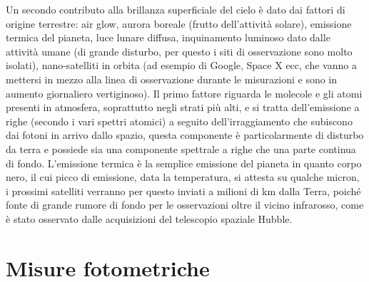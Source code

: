 \documentclass[a4paper,twoside,openany,notitlepage]{book}
\theoremstyle{definition}
\theoremstyle{plain}
\begin{document}
Un secondo contributo alla brillanza superficiale del cielo è dato dai fattori di origine terrestre: air glow, aurora boreale (frutto dell'attività solare), emissione termica del pianeta, luce lunare diffusa, inquinamento luminoso dato dalle attività umane (di grande disturbo, per questo i siti di osservazione sono molto isolati), nano-satelliti in orbita (ad esempio di Google, Space X ecc, che vanno a mettersi in mezzo alla linea di osservazione durante le misurazioni e sono in aumento giornaliero vertiginoso). Il primo fattore riguarda le molecole e gli atomi presenti in atmosfera, soprattutto negli strati più alti, e si tratta dell'emissione a righe (secondo i vari spettri atomici) a seguito dell'irraggiamento che subiscono dai fotoni in arrivo dallo spazio, questa componente è particolarmente di disturbo da terra e possiede sia una componente spettrale a righe che una parte continua di fondo. L'emissione termica è la semplice emissione del pianeta in quanto corpo nero, il cui picco di emissione, data la temperatura, si attesta su qualche micron, i prossimi satelliti verranno per questo inviati a milioni di km dalla Terra, poiché fonte di grande rumore di fondo per le osservazioni oltre il vicino infrarosso, come è stato osservato dalle acquisizioni del telescopio spaziale Hubble.

\section{Misure fotometriche}
\end{document}
